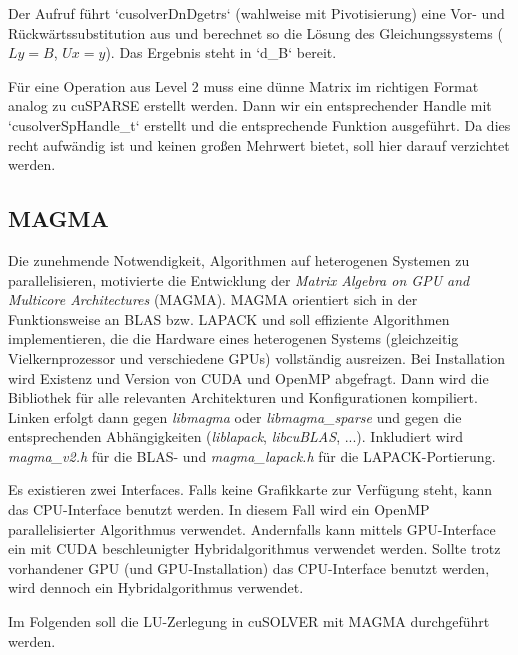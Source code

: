 		Der Aufruf führt \li`cusolverDnDgetrs` (wahlweise mit Pivotisierung) eine Vor- und Rückwärtssubstitution aus und berechnet so die Lösung des Gleichungssystems ($Ly = B$, $Ux = y$). Das Ergebnis steht in \li`d_B` bereit.
		
		Für eine Operation aus Level 2 muss eine dünne Matrix im richtigen Format analog zu cuSPARSE erstellt werden. Dann wir ein entsprechender \Gls{Handle} mit \li`cusolverSpHandle_t` erstellt und die entsprechende Funktion ausgeführt. Da dies recht aufwändig ist und keinen großen Mehrwert bietet, soll hier darauf verzichtet werden.
		
		\subsection{MAGMA}
		Die zunehmende Notwendigkeit, Algorithmen auf heterogenen Systemen zu parallelisieren, motivierte die Entwicklung der \textit{Matrix Algebra on GPU and Multicore Architectures} (MAGMA). MAGMA orientiert sich in der Funktionsweise an BLAS bzw. LAPACK und soll effiziente Algorithmen implementieren, die die Hardware eines heterogenen Systems (gleichzeitig Vielkernprozessor und verschiedene GPUs) vollständig ausreizen. Bei Installation wird Existenz und Version von CUDA und OpenMP abgefragt. Dann wird die Bibliothek für alle relevanten Architekturen und Konfigurationen kompiliert. Linken erfolgt dann gegen \textit{libmagma} oder \textit{libmagma{\_}sparse} und gegen die entsprechenden Abhängigkeiten (\textit{liblapack}, \textit{libcuBLAS}, ...). Inkludiert wird \textit{magma{\_}v2.h} für die BLAS- und \textit{magma{\_}lapack.h} für die LAPACK-Portierung.

		Es existieren zwei Interfaces. Falls keine Grafikkarte zur Verfügung steht, kann das CPU-Interface benutzt werden. In diesem Fall wird ein OpenMP parallelisierter Algorithmus verwendet. Andernfalls kann mittels GPU-Interface ein mit CUDA beschleunigter Hybridalgorithmus verwendet werden. Sollte trotz vorhandener GPU (und GPU-Installation) das CPU-Interface benutzt werden, wird dennoch ein Hybridalgorithmus verwendet.
		
		Im Folgenden soll die LU-Zerlegung in cuSOLVER mit MAGMA durchgeführt werden.
		
